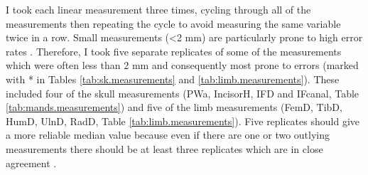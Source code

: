 	I took each linear measurement three times, cycling through all of the measurements then repeating the cycle to avoid measuring the same variable twice in a row. Small measurements (<2 mm) are particularly prone to high error rates \citep{Cardini2008}. Therefore, I took five separate replicates of some of the measurements which were often less than 2 mm and consequently most prone to errors (marked with * in Tables \ref{tab:sk.measurements} and \ref{tab:limb.measurements}). These included four of the skull measurements (PWa, IncisorH, IFD and IFcanal, Table \ref{tab:mands.measurements}) and five of the limb measurements (FemD, TibD, HumD, UlnD, RadD, Table \ref{tab:limb.measurements}). 
	Five replicates should give a more reliable median value because even if there are one or two outlying measurements there should be at least three replicates which are in close agreement \citep{Cooper2009}.

